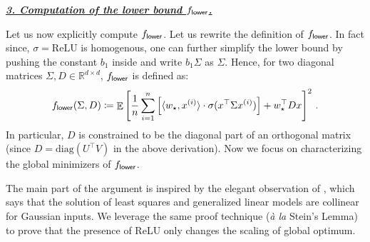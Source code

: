 \documentclass{article}
\DeclareMathOperator{\E}{\mathbb{E}}
\newcommand{\R}{\mathbb{R}}
\newcommand{\relu}{\sigma}
\newcommand{\cc}{b}
\newcommand{\wstar}{w_\star}
\newcommand{\tx}[1]{x^{(#1)}}
\newcommand{\ttf}{f_{\sf lower}}
\newcommand{\emphh}[1]{\textbf{\emph{#1}}}
\newcommand{\inpp}[2]{ \langle #1,#2\rangle}
\newcommand{\diag}{\mathrm{diag}}
\begin{document}
 \underline{\emphh{3. Computation of the lower bound $\ttf$.}}

Let us now explicitly compute
$\ttf$. Let us rewrite the definition of $\ttf$.
In fact since, $\relu = \mathrm{ReLU}$ is homogenous, one can further simplify the lower bound by pushing the constant $\cc_1$ inside and write $\cc_1 \Sigma$  as $\Sigma$.
Hence, for two diagonal matrices $\Sigma, D\in \R^{d\times d}$, $\ttf$ is defined as:
\begin{align}
    \ttf(\Sigma, D) \coloneqq  \E \left[  \frac{1}{n}\sum_{i=1}^n \left[ \inpp{\wstar}{\tx{i}}\cdot \relu (x^\top \Sigma \tx{i}  )\right] +  \wstar^\top D x   \right]^2\,.
\end{align}
In particular, $D$ is constrained to be the diagonal part of an orthogonal matrix (since $D=  \diag( U^\top V)$ in the above derivation).
Now we focus on characterizing the global minimizers of $\ttf$.

The main part of the argument is inspired by the elegant observation of \cite{erdogdu2016scaled}, which says that the solution of least squares and generalized linear models are collinear for Gaussian inputs. 
We leverage the same proof technique (\emph{\`{a} la} Stein's Lemma) to prove that the presence of ReLU only changes the scaling of global optimum. 
\end{document}
